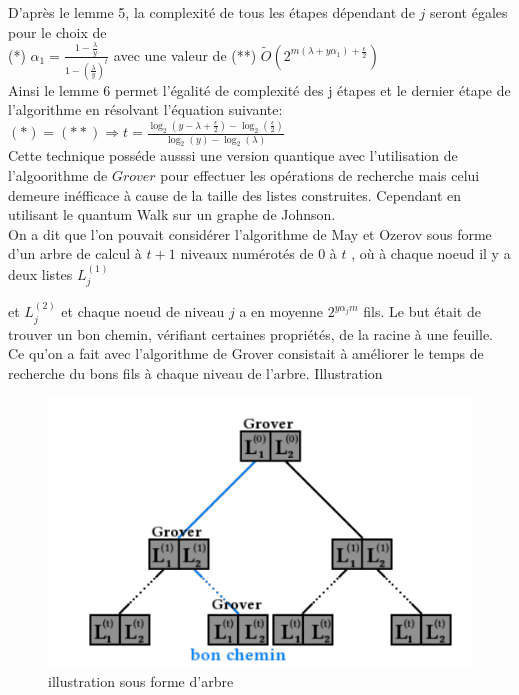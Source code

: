 \documentclass[12pt,openany]{report}
\begin{document}
D'après le lemme 5, la complexité de tous les étapes dépendant de $j$ seront égales pour le choix de \\
(*) $ \alpha_1 = \frac{1-\frac{\lambda}{y}}{1-({\frac{\lambda}{y}})^{t}}  $ 
avec une valeur de (**) $\tilde{O}\left( 2^{m(\lambda + y \alpha_1)+\frac{\epsilon}{2}} \right)  $\\
Ainsi le lemme 6 permet l'égalité de complexité des j étapes et le dernier étape de l'algorithme en résolvant l'équation suivante:\\

$ (*)=(**) \Rightarrow t=\frac{\log_2(y-\lambda + \frac{\epsilon}{2})-\log_2(\frac{\epsilon}{2})}{\log_2(y)-\log_2(\lambda)} $\\
Cette technique posséde ausssi une version quantique avec l'utilisation de l'algoorithme de $ Grover $ pour effectuer les opérations de recherche mais celui demeure inéfficace à cause de la taille des listes construites. Cependant en utilisant le quantum Walk sur un graphe de Johnson.\\

On a dit que l’on pouvait considérer l’algorithme de May et Ozerov sous forme
d’un arbre de calcul à $ t + 1 $ niveaux numérotés de 0 à $t$ , où à chaque noeud il
y a deux listes $L_j^{(1)}$

et $L_j^{(2)}$
et chaque noeud de niveau $j$ a en moyenne $2^{y \alpha_j m} $
fils. Le but était de trouver un bon chemin, vérifiant certaines propriétés, de la
racine à une feuille.
Ce qu’on a fait avec l’algorithme de Grover consistait à améliorer le temps de
recherche du bons fils à chaque niveau de l’arbre. Illustration 

\begin{center}

\begin{figure}


\includegraphics[scale=1]{./nearst_walk}
\caption{ illustration sous forme d'arbre}

\end{figure}
\end{center}
\end{document}
